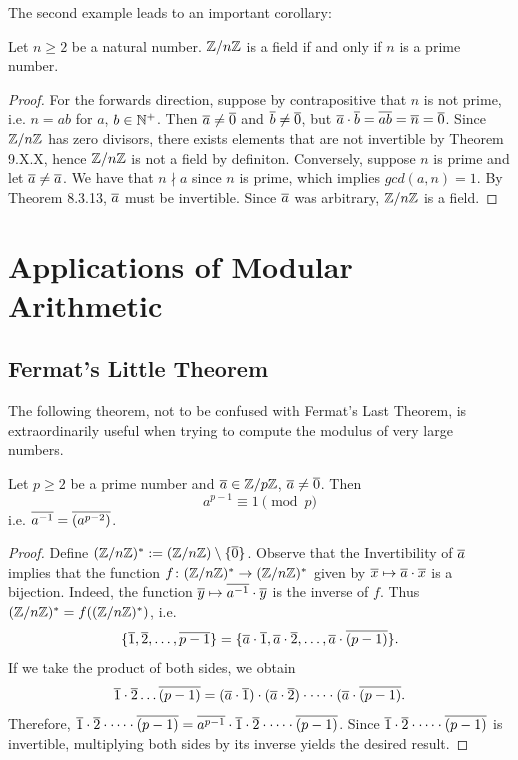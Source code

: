 The second example leads to an important corollary:

\begin{corrbox}
   Let $n \geq 2$ be a natural number. $\mathbb{Z}/n\mathbb{Z}$ is a field if and only if $n$ is a prime number.
\end{corrbox}
\begin{proof}
   For the forwards direction, suppose by contrapositive that $n$ is not prime, i.e. $n = ab$ for $a$, $b \in \mathbb{N}^+$. Then $\overline{a} \neq \overline{0}$ and $\overline{b} \neq \overline{0}$, but $\overline{a}\cdot\overline{b} = \overline{ab} = \overline{n} = \overline{0}$. Since $\mathbb{Z}/n\mathbb{Z}$ has zero divisors, there exists elements that are not invertible by Theorem 9.X.X, hence $\mathbb{Z}/n\mathbb{Z}$ is not a field by definiton. Conversely, suppose $n$ is prime and let $\overline{a} \neq \overline{a}$. We have that $n \nmid a$ since $n$ is prime, which implies $gcd(a,n) = 1$. By Theorem 8.3.13, $\overline{a}$ must be invertible. Since $\overline{a}$ was arbitrary, $\mathbb{Z}/n\mathbb{Z}$ is a field.
\end{proof}

\section{Applications of Modular Arithmetic}

\subsection{Fermat's Little Theorem}

The following theorem, not to be confused with Fermat's Last Theorem, is extraordinarily useful when trying to compute the modulus of very large numbers.

\begin{thmbox}
   Let $p \geq 2$ be a prime number and $\overline{a} \in \mathbb{Z}/p\mathbb{Z}$, $\overline{a} \neq \overline{0}$. Then 
   \[ a^{p-1} \equiv 1 \pmod{p} \]
   i.e. $\overline{a^{-1}} = \overline{(a^{p-2})}$. 
\end{thmbox}
\begin{proof}
   Define $(\mathbb{Z}/n\mathbb{Z})^* := (\mathbb{Z}/n\mathbb{Z}) \setminus \{\overline{0}\}$. Observe that the Invertibility of $\overline{a}$ implies that the function $f \colon (\mathbb{Z}/n\mathbb{Z})^* \to (\mathbb{Z}/n\mathbb{Z})^*$ given by $\overline{x} \mapsto \overline{a} \cdot \overline{x}$ is a bijection. Indeed, the function $\overline{y} \mapsto \overline{a^{-1}} \cdot \overline{y}$ is the inverse of $f$. Thus $(\mathbb{Z}/n\mathbb{Z})^* = f((\mathbb{Z}/n\mathbb{Z})^*)$, i.e. 
   \[ \{\overline{1}, \overline{2}, \dots, \overline{p-1} \} = \{\overline{a}\cdot\overline{1}, \overline{a} \cdot \overline{2}, \dots, \overline{a}\cdot\overline{(p-1)} \}.\]
   If we take the product of both sides, we obtain
   \[ \overline{1} \cdot \overline{2} \dots \overline{(p-1)} = (\overline{a} \cdot \overline{1}) \cdot (\overline{a} \cdot \overline{2}) \cdot \dots \cdot (\overline{a} \cdot \overline{(p-1)}.\]
   Therefore, $\overline{1} \cdot \overline{2} \cdot \dots \cdot \overline{(p-1)} = \overline{a^{p-1}} \cdot \overline{1} \cdot \overline{2} \cdot \dots \cdot \overline{(p-1)}$. Since $\overline{1} \cdot \overline{2} \cdot \dots \cdot \overline{(p-1)}$ is invertible, multiplying both sides by its inverse yields the desired result.
\end{proof}

